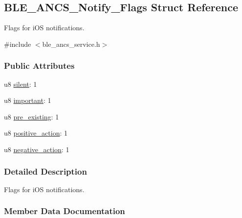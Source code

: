 \hypertarget{struct_b_l_e___a_n_c_s___notify___flags}{}\subsection{B\+L\+E\+\_\+\+A\+N\+C\+S\+\_\+\+Notify\+\_\+\+Flags Struct Reference}
\label{struct_b_l_e___a_n_c_s___notify___flags}


Flags for i\+OS notifications.  




{\ttfamily \#include $<$ble\+\_\+ancs\+\_\+service.\+h$>$}

\subsubsection*{Public Attributes}
\begin{DoxyCompactItemize}
\item 
u8 \hyperlink{struct_b_l_e___a_n_c_s___notify___flags_a1b8ada6c761d65c2a837c1ea321c5751}{silent}\+: 1
\item 
u8 \hyperlink{struct_b_l_e___a_n_c_s___notify___flags_a209c6873ff8d2bae138181b645532265}{important}\+: 1
\item 
u8 \hyperlink{struct_b_l_e___a_n_c_s___notify___flags_a681600a1c4c544ee801e86b8045ba684}{pre\+\_\+existing}\+: 1
\item 
u8 \hyperlink{struct_b_l_e___a_n_c_s___notify___flags_a1f24b78d8655ce8af02364392eb68c22}{positive\+\_\+action}\+: 1
\item 
u8 \hyperlink{struct_b_l_e___a_n_c_s___notify___flags_aa7d76d1a64de63a4c9d2c29bb951fa9f}{negative\+\_\+action}\+: 1
\end{DoxyCompactItemize}


\subsubsection{Detailed Description}
Flags for i\+OS notifications. 

\subsubsection{Member Data Documentation}
